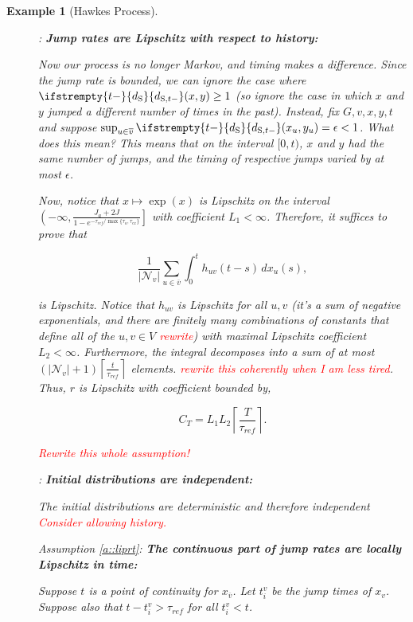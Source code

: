 \documentclass[12pt]{article}
\newcommand{\mc}{\mathcal}
\newcommand{\ov}{\overline}
\newcommand{\te}{\text}
\newcommand{\tr}{\textcolor{red}}
\newcommand{\ind}{\hspace{24pt}}
\newcommand{\neigh}[1]{\mc{N}_{#1}}				%
\newcommand{\cl}[1]{\ov{#1}}						%
\newcommand{\rate}{r}								%
\newcommand{\stmet}[1]{
\ifstrempty{#1}{
	d_{\te{S}}}{
	d_{\te{S},#1}}}									%
\newcommand{\xf}{x}									%
\newcommand{\xg}{y}									%
\newcommand{\vind}[1]{_{#1}}						%
\newcommand{\jumpbd}[1]{C_{#1}}						%
\newtheorem{example}[thms]{Example}
\begin{document}
\begin{example}[Hawkes Process]
\begin{description}
\item[] \cite[Assumption \ref{F-a::liprx}]{F}: \textbf{Jump rates are Lipschitz with respect to history:}

Now our process is no longer Markov, and timing makes a difference. Since the jump rate is bounded, we can ignore the case where \(\stmet{t-}(\xf,\xg) \geq 1\) (so ignore the case in which \(\xf\) and \(\xg\) jumped a different number of times in the past). Instead, fix \(G,v,\xf,\xg,t\) and suppose \(\sup_{u \in \cl{v}}\stmet{t-}(\xf\vind{u},\xg\vind{u}) = \epsilon < 1\). What does this mean? This means that on the interval \([0,t)\), \(\xf\) and \(\xg\) had the same number of jumps, and the timing of respective jumps varied by at most \(\epsilon\).

\ind Now, notice that \(x \mapsto \exp(x)\) is Lipschitz on the interval \(\left(-\infty,\frac{J_a + 2J}{1 - e^{-\tau_{ref}/\max\{\tau_a,\tau_{ex}\}}}\right]\) with coefficient \(L_1 < \infty\). Therefore, it suffices to prove that

\[\frac{1}{|\neigh{v}|}\sum_{u \in \cl{v}}\int_0^t h_{uv}(t-s)\,d\xf_u(s),\]

is Lipschitz. Notice that \(h_{uv}\) is Lipschitz for all \(u,v\) (it's a sum of negative exponentials, and there are finitely many combinations of constants that define all of the \(u,v \in V\) \tr{rewrite}) with maximal Lipschitz coefficient \(L_2 <\infty\). Furthermore, the integral decomposes into a sum of at most \((|\neigh{v}|+1)\left\lceil\frac{t}{\tau_{ref}}\right\rceil\) elements. \tr{rewrite this coherently when I am less tired}. Thus, \(\rate\) is Lipschitz with coefficient bounded by,

\[\jumpbd{T}  = L_1L_2\left\lceil\frac{T}{\tau_{ref}}\right\rceil.\]

\tr{Rewrite this whole assumption!}

\item[] \cite[Assumption \ref{F-CI::indinit}]{F}: \textbf{Initial distributions are independent:}

The initial distributions are deterministic and therefore independent \tr{Consider allowing history.}

\item[] Assumption \ref{a::liprt}: \textbf{The continuous part of jump rates are locally Lipschitz in time:}

Suppose \(t\) is a point of continuity for \(\xf\vind{\cl{v}}\). Let \(t^v_i\) be the jump times of \(\xf\vind{v}\). Suppose also that \(t - t^v_i > \tau_{ref}\) for all \(t^v_i < t\).


\end{description}
\end{example}
\end{document}
